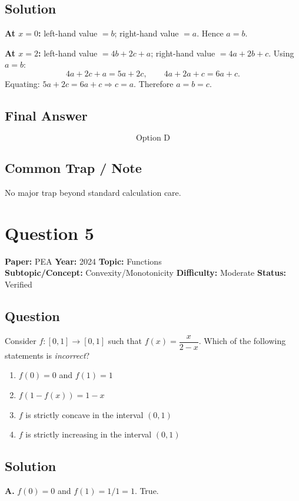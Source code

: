 \documentclass[11pt]{article}
\begin{document}
\subsection*{Solution}
\textbf{At $x=0$:} left-hand value $=b$; right-hand value $=a$. Hence $a=b$.

\textbf{At $x=2$:} left-hand value $= 4b+2c+a$; right-hand value $=4a+2b+c$. Using $a=b$:
\[
4a+2c+a=5a+2c,\qquad 4a+2a+c=6a+c.
\]
Equating: $5a+2c=6a+c \Rightarrow c=a$. Therefore $a=b=c$.

\subsection*{Final Answer}
\[
\boxed{\text{Option D}}
\]

\subsection*{Common Trap / Note}
No major trap beyond standard calculation care.

\section*{Question 5}
\textbf{Paper:} PEA \quad \textbf{Year:} 2024 \quad \textbf{Topic:} Functions \\
\textbf{Subtopic/Concept:} Convexity/Monotonicity \quad \textbf{Difficulty:} Moderate \quad \textbf{Status:} Verified

\subsection*{Question}
Consider $f:[0,1]\to[0,1]$ such that $f(x)=\dfrac{x}{2-x}$. Which of the following statements is \emph{incorrect}?
\begin{enumerate}[label=(\Alph*)]
\item $f(0)=0$ and $f(1)=1$
\item $f(1-f(x))=1-x$
\item $f$ is strictly concave in the interval $(0,1)$
\item $f$ is strictly increasing in the interval $(0,1)$
\end{enumerate}

\subsection*{Solution}
\textbf{A.} $f(0)=0$ and $f(1)=1/1=1$. True.
\end{document}
